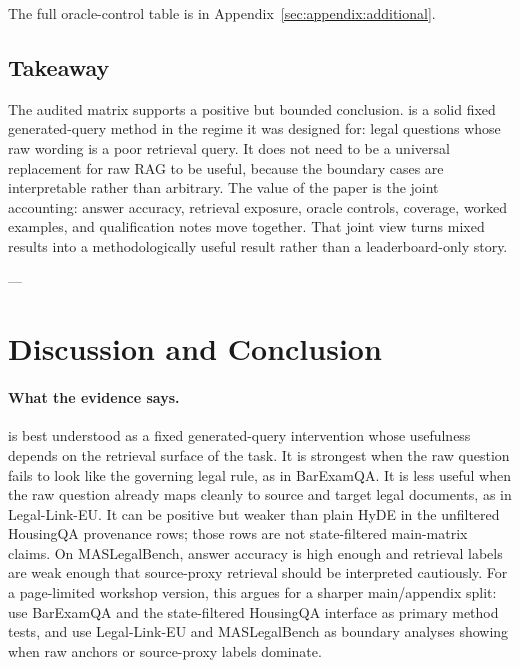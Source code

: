 The full oracle-control table is in Appendix~\ref{sec:appendix:additional}.

\subsection{Takeaway}
The audited matrix supports a positive but bounded conclusion. \hyre{} is a
solid fixed generated-query method in the regime it was designed for: legal
questions whose raw wording is a poor retrieval query. It does not need to be a
universal replacement for raw RAG to be useful, because the boundary cases are
interpretable rather than arbitrary. The value of the paper is the joint
accounting: answer accuracy, retrieval exposure, oracle controls, coverage,
worked examples, and qualification notes move together. That joint view turns
mixed results into a methodologically useful result rather than a
leaderboard-only story.

---
\section{Discussion and Conclusion}\label{sec:conclusion}
\paragraph{What the evidence says.}
\hyre{} is best understood as a fixed generated-query intervention whose
usefulness depends on the retrieval surface of the task. It is strongest when
the raw question fails to look like the governing legal rule, as in BarExamQA.
It is less useful when the raw question already maps cleanly to source and
target legal documents, as in Legal-Link-EU. It can be positive but weaker than
plain HyDE in the unfiltered HousingQA provenance rows; those rows are not
state-filtered main-matrix claims. On MASLegalBench, answer accuracy is high
enough and retrieval labels
are weak enough that source-proxy retrieval should be interpreted cautiously.
For a page-limited workshop version, this argues for a sharper main/appendix
split: use BarExamQA and the state-filtered HousingQA interface as primary
method tests, and use Legal-Link-EU and MASLegalBench as boundary analyses
showing when raw anchors or source-proxy labels dominate.

